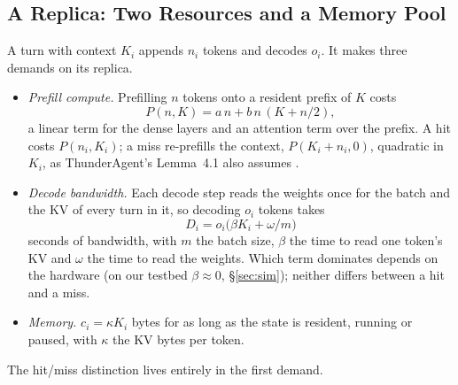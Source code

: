\documentclass{article}
\theoremstyle{plain}
\theoremstyle{definition}
\theoremstyle{remark}
\begin{document}
\subsection{A Replica: Two Resources and a Memory Pool}\label{sec:batch}\label{sec:queue}

A turn with context $K_i$ appends $n_i$ tokens and decodes $o_i$. It
makes three demands on its replica.
\begin{itemize}[nosep,leftmargin=*]
\item \emph{Prefill compute.} Prefilling $n$ tokens onto a resident
  prefix of $K$ costs
  \begin{equation}\label{eq:prefill}
    P(n,K)=a\,n+b\,n\,(K+n/2),
  \end{equation}
  a linear term for the dense layers and an attention term over the
  prefix. A hit costs $P(n_i,K_i)$; a miss re-prefills the context,
  $P(K_i+n_i,0)$, quadratic in $K_i$, as ThunderAgent's Lemma~4.1 also
  assumes \citep{thunderagent}.
\item \emph{Decode bandwidth.} Each decode step reads the weights once
  for the batch and the KV of every turn in it, so decoding $o_i$ tokens
  takes
  \begin{equation}\label{eq:decode}
    D_i = o_i\bigl(\beta K_i+\omega/m\bigr)
  \end{equation}
  seconds of bandwidth, with $m$ the batch size, $\beta$ the time to
  read one token's KV and $\omega$ the time to read the weights. Which
  term dominates depends on the hardware (on our testbed $\beta\approx0$,
  \S\ref{sec:sim}); neither differs between a hit and a miss.
\item \emph{Memory.} $c_i=\kappa K_i$ bytes for as long as the state is
  resident, running or paused, with $\kappa$ the KV bytes per token.
\end{itemize}
The hit/miss distinction lives entirely in the first demand.
\end{document}
